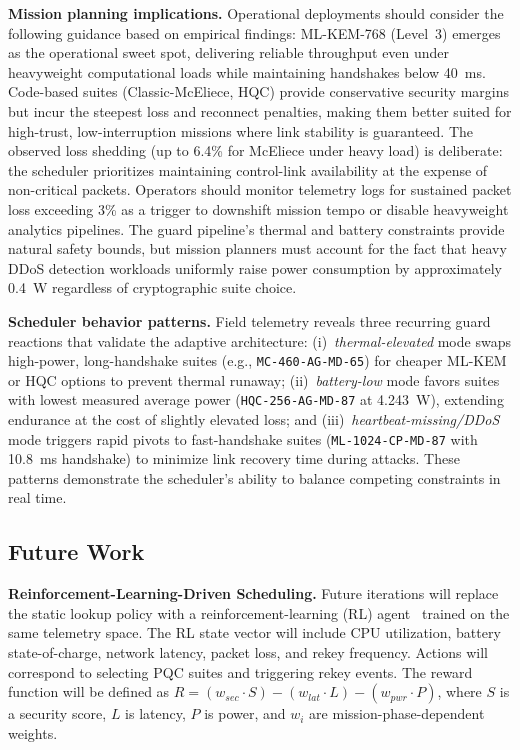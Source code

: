 \documentclass[sigconf,natbib=false]{acmart}
\begin{document}
\textbf{Mission planning implications.} Operational deployments should consider the following guidance based on empirical findings: ML-KEM-768 (Level~3) emerges as the operational sweet spot, delivering reliable throughput even under heavyweight computational loads while maintaining handshakes below 40~ms. Code-based suites (Classic-McEliece, HQC) provide conservative security margins but incur the steepest loss and reconnect penalties, making them better suited for high-trust, low-interruption missions where link stability is guaranteed. The observed loss shedding (up to 6.4\% for McEliece under heavy load) is deliberate: the scheduler prioritizes maintaining control-link availability at the expense of non-critical packets. Operators should monitor telemetry logs for sustained packet loss exceeding 3\% as a trigger to downshift mission tempo or disable heavyweight analytics pipelines. The guard pipeline's thermal and battery constraints provide natural safety bounds, but mission planners must account for the fact that heavy DDoS detection workloads uniformly raise power consumption by approximately 0.4~W regardless of cryptographic suite choice.

\textbf{Scheduler behavior patterns.} Field telemetry reveals three recurring guard reactions that validate the adaptive architecture: (i)~\textit{thermal-elevated} mode swaps high-power, long-handshake suites (e.g., \texttt{MC-460-AG-MD-65}) for cheaper ML-KEM or HQC options to prevent thermal runaway; (ii)~\textit{battery-low} mode favors suites with lowest measured average power (\texttt{HQC-256-AG-MD-87} at 4.243~W), extending endurance at the cost of slightly elevated loss; and (iii)~\textit{heartbeat-missing/DDoS} mode triggers rapid pivots to fast-handshake suites (\texttt{ML-1024-CP-MD-87} with 10.8~ms handshake) to minimize link recovery time during attacks. These patterns demonstrate the scheduler's ability to balance competing constraints in real time.

\subsection{Future Work}

\textbf{Reinforcement-Learning-Driven Scheduling.} Future iterations will replace the static lookup policy with a reinforcement-learning (RL) agent~\cite{watkins1992qlearning,hortelano_rl_edge_survey_2023} trained on the same telemetry space. The RL state vector will include CPU utilization, battery state-of-charge, network latency, packet loss, and rekey frequency. Actions will correspond to selecting PQC suites and triggering rekey events. The reward function will be defined as $R = (w_{sec} \cdot S) - (w_{lat} \cdot L) - (w_{pwr} \cdot P)$, where $S$ is a security score, $L$ is latency, $P$ is power, and $w_i$ are mission-phase-dependent weights.
\end{document}
